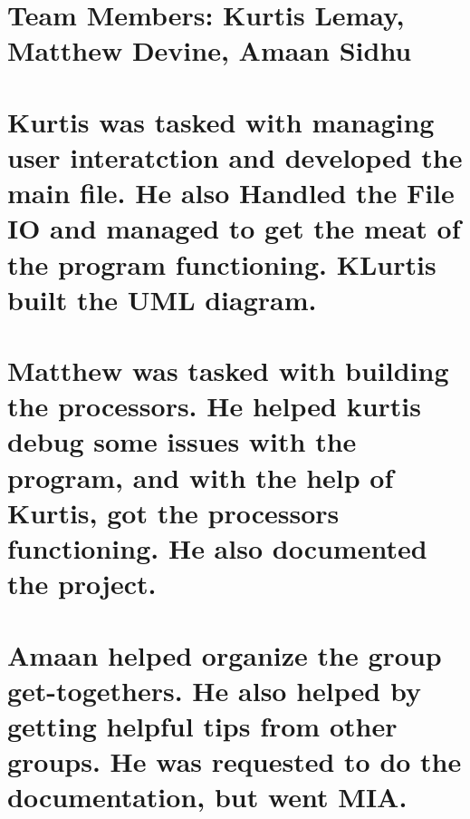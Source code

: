 \section*{Team Members\+: Kurtis Lemay, Matthew Devine, Amaan Sidhu}

\section*{Kurtis was tasked with managing user interatction and developed the main file. He also Handled the File IO and managed to get the meat of the program functioning. K\+Lurtis built the U\+ML diagram.}

\section*{Matthew was tasked with building the processors. He helped kurtis debug some issues with the program, and with the help of Kurtis, got the processors functioning. He also documented the project.}

\section*{Amaan helped organize the group get-\/togethers. He also helped by getting helpful tips from other groups. He was requested to do the documentation, but went M\+IA.}